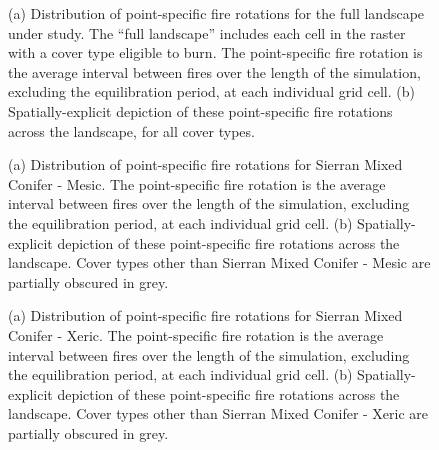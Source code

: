 \begin{figure}[!htbp]
  \centering
  \qquad
  \caption{(a) Distribution of point-specific fire rotations for the full landscape under study. The ``full landscape'' includes each cell in the raster with a cover type eligible to burn. The point-specific fire rotation is the average interval between fires over the length of the simulation, excluding the equilibration period, at each individual grid cell. (b) Spatially-explicit depiction of these point-specific fire rotations across the landscape, for all cover types.}
  \label{fig:preturn}
\end{figure}

\begin{figure}[!htbp]
  \centering
  \caption{(a) Distribution of point-specific fire rotations for Sierran Mixed Conifer - Mesic. The point-specific fire rotation is the average interval between fires over the length of the simulation, excluding the equilibration period, at each individual grid cell. (b) Spatially-explicit depiction of these point-specific fire rotations across the landscape. Cover types other than Sierran Mixed Conifer - Mesic are partially obscured in grey.}
\label{fig:preturn_smcm}
\end{figure}

\begin{figure}[!htbp]
  \centering
  \caption{(a) Distribution of point-specific fire rotations for Sierran Mixed Conifer - Xeric. The point-specific fire rotation is the average interval between fires over the length of the simulation, excluding the equilibration period, at each individual grid cell. (b) Spatially-explicit depiction of these point-specific fire rotations across the landscape. Cover types other than Sierran Mixed Conifer - Xeric are partially obscured in grey.}
\label{fig:preturn_smcx}
\end{figure}

